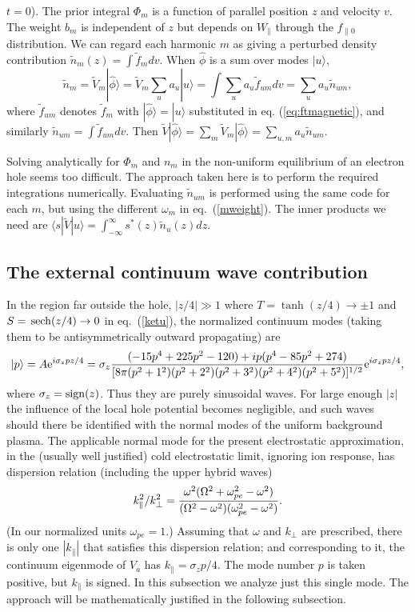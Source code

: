 \documentclass{jpp}
\def\ket#1{|#1\rangle}
\def\bra#1{\langle#1}
\def\sech{{\,\rm sech}}
\def\etothe#1{{\rm e}^{#1}}
\begin{document}
$t=0$). The prior integral $\Phi_m$ is a function of parallel position
$z$ and velocity $v$. The weight $b_m$ is independent of $z$ but
depends on $W_\parallel$ through the $f_{\parallel0}$ distribution.
We can regard each harmonic $m$ as giving a perturbed density
contribution $\tilde n_m(z)=\int \tilde f_m dv$. When $\hat\phi$ is a
sum over modes $\ket{u}$,
\begin{equation}
  \label{nmexpansion}
\tilde  n_m=\tilde{V}_{m}\ket{\hat\phi}=\tilde{V}_{m}\sum_u a_u\ket{u}=\int \sum_u a_u
  \tilde f_{um} dv=\sum_u a_u \tilde n_{um},
\end{equation}
where $\tilde f_{um}$ denotes $\tilde f_m$ with
$\ket{\hat\phi}=\ket{u}$ substituted in eq. (\ref{eq:ftmagnetic}), and
similarly $\tilde n_{um}=\int \tilde f_{um}dv$. Then
$\tilde V \ket{\hat\phi}=\sum_m\tilde
V_m\ket{\hat\phi}=\sum_{u,m}a_u\tilde n_{um}$.

Solving analytically for $\Phi_m$ and $n_m$ in the non-uniform
equilibrium of an electron hole seems too difficult. The approach
taken here is to perform the required integrations numerically.
 Evaluating $\tilde
n_{um}$ is performed using the same code for each $m$, but using the
different $\omega_m$ in eq.\ (\ref{mweight}). The inner products
we need are $\bra{s}|\tilde V\ket{u}=\int_{-\infty}^\infty s^*(z)\tilde
n_{u}(z) dz$.

\subsection{The external continuum wave contribution}

In the region far outside the hole, $|z/4|\gg 1$ where
$T=\tanh(z/4)\to\pm1$ and $S=\sech(z/4)\to0$ in eq.\ (\ref{ketu}), the
normalized continuum modes (taking them to be antisymmetrically
outward propagating) are
\begin{equation}
  \label{outercont}
 \ket{p}=A\etothe{i\sigma_zpz/4}=\sigma_z{(-15p^4+225p^2-120) +ip (p^{4}-85p^{2}+274)\over
      [8\pi(p^2+1^2)(p^2+2^2)(p^2+3^2)(p^2+4^2)(p^2+5^2)]^{1/2}}\etothe{i\sigma_zpz/4},
\end{equation}
where $\sigma_z={\rm sign}(z)$. Thus they are purely sinusoidal
waves. For large enough $|z|$ the influence of the local hole
potential becomes negligible, and such waves should there be
identified with the normal modes of the uniform background plasma.
The applicable normal mode for the present electrostatic
approximation, in the (usually well justified) cold electrostatic limit,
ignoring ion response, has dispersion relation (including the upper
hybrid waves)
\begin{equation}
  \label{colddisp}
  k_\parallel^2/k_\perp^2={\omega^2(\Omega^2+\omega_{pe}^2-\omega^2)
    \over(\Omega^2-\omega^2)(\omega_{pe}^2-\omega^2)}.
\end{equation}
(In our normalized units $\omega_{pe}=1$.)  Assuming that $\omega$ and
$k_\perp$ are prescribed, there is only one $|k_\parallel|$ that
satisfies this dispersion relation; and corresponding to it, the
continuum eigenmode of $V_a$ has $k_\parallel=\sigma_zp/4$. The mode
number $p$ is taken positive, but $k_\parallel$ is signed. In this
subsection we analyze just this single mode. The approach will be
mathematically justified in the following subsection.
\end{document}
